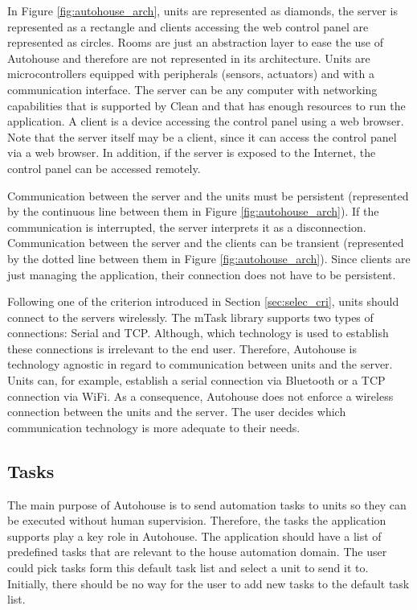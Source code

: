 In Figure \ref{fig:autohouse_arch}, units are represented as diamonds, the server is represented as a rectangle and clients accessing the web control panel are represented as circles. Rooms are just an abstraction layer to ease the use of Autohouse and therefore are not represented in its architecture. Units are microcontrollers equipped with peripherals (sensors, actuators) and with a communication interface. The server can be any computer with networking capabilities that is supported by Clean and that has enough resources to run the application. A client is a device accessing the control panel using a web browser. Note that the server itself may be a client, since it can access the control panel via a web browser. In addition, if the server is exposed to the Internet, the control panel can be accessed remotely. 

Communication between the server and the units must be persistent (represented by the continuous line between them in Figure \ref{fig:autohouse_arch}). If the communication is interrupted, the server interprets it as a disconnection. Communication between the server and the clients can be transient (represented by the dotted line between them in Figure \ref{fig:autohouse_arch}). Since clients are just managing the application, their connection does not have to be persistent. 

Following one of the criterion introduced in Section \ref{sec:selec_cri}, units should connect to the servers wirelessly. The mTask library supports two types of connections: Serial and TCP. Although, which technology is used to establish these connections is irrelevant to the end user. Therefore, Autohouse is technology agnostic in regard to communication between units and the server. Units can, for example, establish a serial connection via Bluetooth or a TCP connection via WiFi. As a consequence, Autohouse does not enforce a wireless connection between the units and the server. The user decides which communication technology is more adequate to their needs.

\subsection{Tasks}

The main purpose of Autohouse is to send automation tasks to units so they can be executed without human supervision. Therefore, the tasks the application supports play a key role in Autohouse. The application should have a list of predefined tasks that are relevant to the house automation domain. The user could pick tasks form this default task list and select a unit to send it to. Initially, there should be no way for the user to add new tasks to the default task list.

